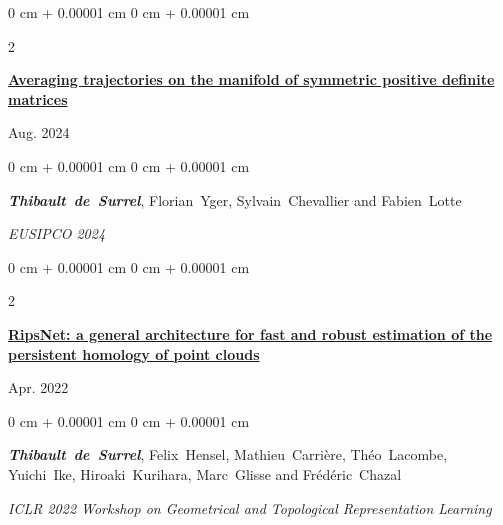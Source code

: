 \documentclass[10pt, letterpaper]{article}
\newenvironment{onecolentry}{
    \begin{adjustwidth}{
        0 cm + 0.00001 cm
    }{
        0 cm + 0.00001 cm
    }
}{
    \end{adjustwidth}
} %
\newenvironment{twocolentry}[2][]{
    \onecolentry
    \def\secondColumn{#2}
    \setcolumnwidth{\fill, 4.5 cm}
    \begin{paracol}{2}
}{
    \switchcolumn \raggedleft \secondColumn
    \end{paracol}
    \endonecolentry
} %
\begin{document}
        \begin{samepage}
            \begin{twocolentry}{
                Aug. 2024
            }
                \textbf{\href{https://hal.science/hal-04708878v1/document}{Averaging trajectories on the manifold of symmetric positive definite matrices}}
            \end{twocolentry}

            \vspace{0.10 cm}
            
            \begin{onecolentry}
                \mbox{\textbf{\textit{Thibault de Surrel}}}, \mbox{Florian Yger}, \mbox{Sylvain Chevallier} and \mbox{Fabien Lotte}

                \vspace{0.10 cm}
                
        \textit{EUSIPCO 2024} 
        \end{onecolentry}
        \end{samepage}

        \vspace{0.2cm}

        \begin{samepage}
            \begin{twocolentry}{
                Apr. 2022
            }
                \textbf{\href{https://arxiv.org/pdf/2202.01725}{RipsNet: a general architecture for fast and robust estimation of the persistent homology of point clouds}}
            \end{twocolentry}

            \vspace{0.10 cm}
            
            \begin{onecolentry}
                \mbox{\textbf{\textit{Thibault de Surrel}}}, \mbox{Felix Hensel}, \mbox{Mathieu Carrière}, \mbox{Théo Lacombe}, \mbox{Yuichi Ike}, \mbox{Hiroaki Kurihara}, \mbox{Marc Glisse} and \mbox{Frédéric Chazal}

                \vspace{0.10 cm}
                
        \textit{ICLR 2022 Workshop on Geometrical and Topological Representation Learning} 
        \end{onecolentry}
        \end{samepage}

        
\end{document}
